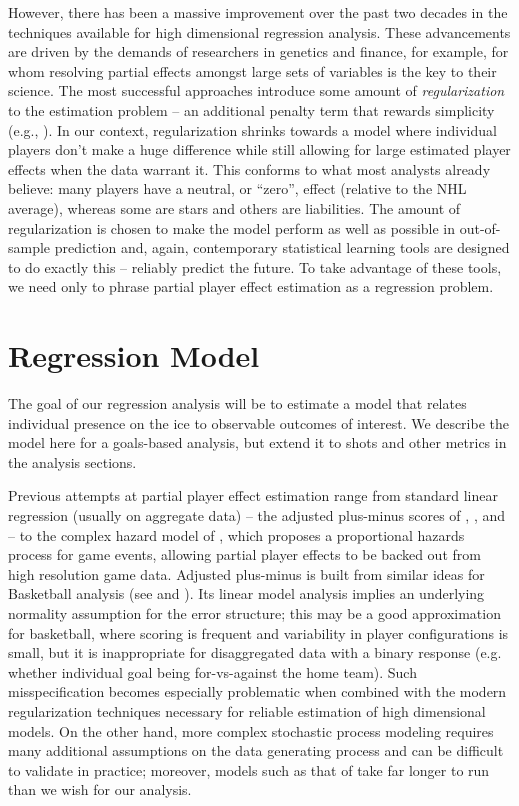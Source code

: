 However, there has been a massive improvement over the past two decades in the
techniques available for high dimensional regression analysis.  These
advancements are driven by the demands of researchers in genetics and finance,
for example, for whom resolving partial effects amongst  large sets of
variables is the key to their science.  The most successful approaches
introduce some amount of \textit{regularization}  to the estimation problem --
an additional penalty term that rewards simplicity (e.g.,
\cite{hastie:tibsh:fried:2001}).  In our context, regularization shrinks
towards a model where individual players don't make a huge difference while
still allowing for large estimated player effects when the data warrant it.
This conforms to what most analysts already believe: many players have a
neutral, or ``zero'', effect (relative to the NHL average), whereas some are
stars and others are liabilities.     The amount of regularization is chosen
to make the model perform as well as possible in out-of-sample prediction and,
again, contemporary statistical learning tools are designed to do exactly this
-- reliably predict the future. To take advantage of these tools, we  need
only to phrase partial player effect estimation  as a regression problem.


 
\section{Regression Model}
\label{sec:regression}

The goal of our regression analysis will be to estimate a model that  relates
individual presence on the ice to observable outcomes of interest.  We
describe the model here for a goals-based analysis, but extend it to shots and
other metrics in the analysis sections.

Previous attempts at partial player effect estimation range from standard linear regression (usually on aggregate data) -- the adjusted plus-minus scores of \cite{awa09}, \cite{schlocwel10},  and \cite{mac10} -- to the complex hazard model of 
\cite{ThoVenJen12}, which proposes a proportional hazards process for
game events, allowing partial player effects to be backed out from high
resolution game data. 
Adjusted plus-minus is built from similar ideas for Basketball analysis (see
\cite{ros04}and \cite{ilabar08}). Its linear model analysis implies an
underlying normality assumption for the error structure; this may be a good
approximation for basketball, where scoring is frequent and variability in
player configurations is small, but it is  inappropriate for disaggregated
data with a binary response (e.g. whether individual goal being for-vs-against the home team).  Such misspecification becomes especially problematic when combined with the modern regularization techniques necessary for reliable estimation of high dimensional models.  On the other hand, more complex stochastic process modeling requires many additional assumptions on the data generating process and can be difficult to validate in practice; moreover, models such as that of \cite{ThoVenJen12} take far longer to run than we wish for our analysis.

